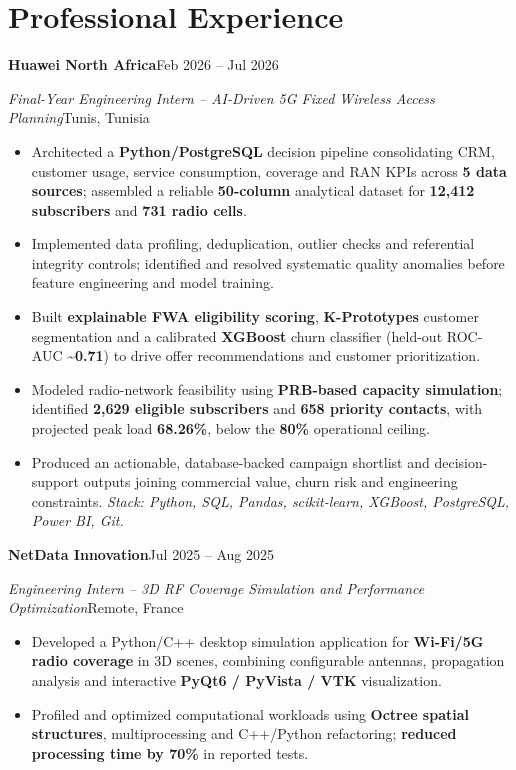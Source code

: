 \documentclass[10pt,a4paper]{article}
\newcommand{\job}[4]{%
  \needspace{6\baselineskip}%
  \textbf{\color{navy}#1}\hfill{\fontsize{8.8}{10}\selectfont\color{gray}#2}\par
  {\fontsize{9.25}{11}\selectfont\textit{#3}\hfill\color{gray}#4}\par
}
\begin{document}
\section{Professional Experience}
\job{Huawei North Africa}{Feb 2026 -- Jul 2026}{Final-Year Engineering Intern -- AI-Driven 5G Fixed Wireless Access Planning}{Tunis, Tunisia}
\begin{itemize}
 \item Architected a \textbf{Python/PostgreSQL} decision pipeline consolidating CRM, customer usage, service consumption, coverage and RAN KPIs across \textbf{5 data sources}; assembled a reliable \textbf{50-column} analytical dataset for \textbf{12,412 subscribers} and \textbf{731 radio cells}.
 \item Implemented data profiling, deduplication, outlier checks and referential integrity controls; identified and resolved systematic quality anomalies before feature engineering and model training.
 \item Built \textbf{explainable FWA eligibility scoring}, \textbf{K-Prototypes} customer segmentation and a calibrated \textbf{XGBoost} churn classifier (held-out ROC-AUC \textbf{\textasciitilde{}0.71}) to drive offer recommendations and customer prioritization.
 \item Modeled radio-network feasibility using \textbf{PRB-based capacity simulation}; identified \textbf{2,629 eligible subscribers} and \textbf{658 priority contacts}, with projected peak load \textbf{68.26\%}, below the \textbf{80\%} operational ceiling.
 \item Produced an actionable, database-backed campaign shortlist and decision-support outputs joining commercial value, churn risk and engineering constraints. \textit{Stack: Python, SQL, Pandas, scikit-learn, XGBoost, PostgreSQL, Power BI, Git.}
\end{itemize}
\vspace{2pt}
\job{NetData Innovation}{Jul 2025 -- Aug 2025}{Engineering Intern -- 3D RF Coverage Simulation and Performance Optimization}{Remote, France}
\begin{itemize}
 \item Developed a Python/C++ desktop simulation application for \textbf{Wi-Fi/5G radio coverage} in 3D scenes, combining configurable antennas, propagation analysis and interactive \textbf{PyQt6 / PyVista / VTK} visualization.
 \item Profiled and optimized computational workloads using \textbf{Octree spatial structures}, multiprocessing and C++/Python refactoring; \textbf{reduced processing time by 70\%} in reported tests.
\end{itemize}
\end{document}
